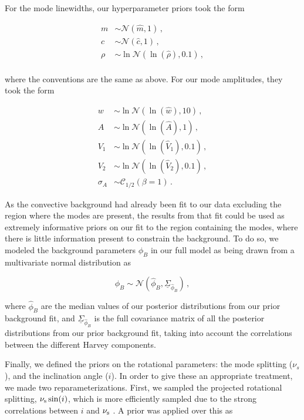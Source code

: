 \documentclass[12pt]{article}
\begin{document}
For the mode linewidths, our hyperparameter priors took the form

\begin{equation}
	\begin{split}
		m &\sim \mathcal{N}(\hat{m}, 1)\, ,\\
		c &\sim \mathcal{N}(\hat{c}, 1)\, ,\\
		\rho &\sim \ln\mathcal{N}(\ln(\hat{\rho}), 0.1)\, ,\\
	\end{split}
\end{equation}

\noindent where the conventions are the same as above. For our mode amplitudes, they took the form

\begin{equation}
	\begin{split}
		w &\sim \ln\mathcal{N}(\ln(\hat{w}), 10)\, ,\\
		A &\sim \ln\mathcal{N}(\ln(\hat{A}), 1)\, ,\\
		V_1 &\sim \ln\mathcal{N}(\ln(\hat{V}_1), 0.1)\, ,\\
		V_2 &\sim \ln\mathcal{N}(\ln(\hat{V}_2), 0.1)\, ,\\
		\sigma_A &\sim \mathcal{C}_{1/2}(\beta = 1)\, .
	\end{split}
\end{equation}

As the convective background had already been fit to our data excluding the region where the modes are present, the results from that fit could be used as extremely informative priors on our fit to the region containing the modes, where there is little information present to constrain the background. To do so, we modeled the background parameters $\phi_B$ in our full model as being drawn from a multivariate normal distribution as

\begin{equation}
	\phi_{B}\sim\mathcal{N}(\hat{\phi}_{B},\underline{\Sigma}_{\hat{\phi}_{B}})\, ,
\end{equation}

\noindent where $\hat{\phi}_B$ are the median values of our posterior distributions from our prior background fit, and $\underline{\Sigma}_{\hat{\phi}_{B}}$ is the full covariance matrix of all the posterior distributions from our prior background fit, taking into account the correlations between the different Harvey components.

Finally, we defined the priors on the rotational parameters: the mode splitting ($\nu_s$), and the inclination angle ($i$). In order to give these an appropriate treatment, we made two reparameterizations. First, we sampled the projected rotational splitting, $\nu_{\rm{s}}\sin(i)$, which is more efficiently sampled due to the strong correlations between $i$ and $\nu_{\rm s}$ \cite{ballot+2006,ballot+2008a}. A prior was applied over this as
\end{document}
